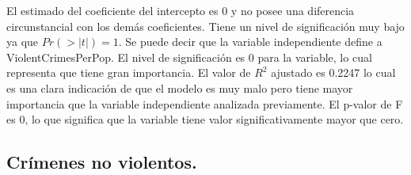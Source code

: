 \documentclass[a4paper,10pt,twocolumn]{article}
\begin{document}
\begin{itemize}
	El estimado del coeficiente del intercepto es 0 y no posee una diferencia circunstancial con los demás coeficientes. Tiene un nivel de significación muy bajo ya que $Pr(> | t | ) =1$.
	Se puede decir que la variable independiente define a ViolentCrimesPerPop. El nivel de significación es 0 para la variable, lo cual representa que tiene gran importancia. El valor de $R^2$ ajustado es 0.2247 lo cual es una clara indicación de que el modelo es muy malo pero tiene mayor importancia que la variable independiente analizada previamente. El p-valor de F es 0, lo que significa que la variable tiene valor significativamente mayor que cero.

\end{itemize}

\subsection*{Crímenes no violentos.}
\end{document}

